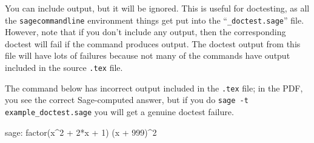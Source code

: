 \documentclass{article}
\begin{document}
You can include output, but it will be ignored. This is useful for
doctesting, as all the \texttt{sagecommandline} environment things get
put into the ``\texttt{\_doctest.sage}'' file. However, note that if you
don't include any output, then the corresponding doctest will fail if
the command produces output. The doctest output from this file will have
lots of failures because not many of the commands have output included
in the source \texttt{.tex} file.

The command below has incorrect output included in the \texttt{.tex}
file; in the PDF, you see the correct Sage-computed answer, but if you
do \texttt{sage -t example\_doctest.sage} you will get a genuine doctest
failure.
\begin{sagecommandline}
  sage: factor(x^2 + 2*x + 1)
  (x + 999)^2
\end{sagecommandline}
\end{document}
